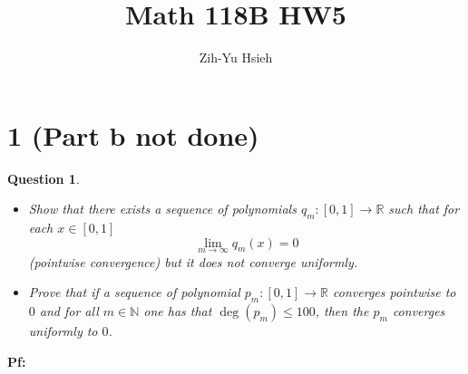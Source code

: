 \documentclass{article}
\title{Math 118B HW5}
\author{Zih-Yu Hsieh}
\newtheorem{question}{Question}
\begin{document}
\maketitle

\section*{1 (Part b not done)}
\begin{myBox}[]{}
    \begin{question}
        
        \hfill
        
        \begin{itemize}
            \item[(a)] Show that there exists a sequence of polynomials $q_m:[0,1]\rightarrow\mathbb{R}$ such that for each $x\in [0,1]$
            $$\lim_{m\rightarrow\infty}q_m(x)=0$$
            (pointwise convergence) but it does not converge uniformly.

            \item[(b)] Prove that if a sequence of polynomial $p_m:[0,1]\rightarrow\mathbb{R}$ converges pointwise to $0$ and for all $m\in\mathbb{N}$ one has that
            $\deg(p_m)\leq 100$, then the $p_m$ converges uniformly to $0$.
        \end{itemize}
    \end{question}
\end{myBox}

\textbf{Pf:}
\end{document}
